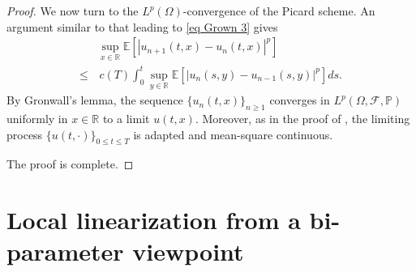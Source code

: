 \documentclass[11pt,reqno]{amsart}
\numberwithin{equation}{section}
\newcommand{\1}{{\bf 1}}
\newcommand{\2}{{\bf 2}}
\begin{document}
\begin{proof}
  We  now turn  to the  $L^p(\Omega)$-convergence of the Picard  scheme.   An argument similar to that leading to    \eqref{eq Grown 3} gives 
 \begin{equation}
 \begin{split}
& \sup_{x\in \mathbb R} \mathbb E \left[\left|u_{n+1}(t, x)-u_{n}(t, x)\right|^p\right]\\
 \le&\,  c(T) \int_0^t   \sup_{y\in \mathbb R} \mathbb E\left[\left|u_{n}(s, y)-u_{n-1}(s, y)\right|^p\right]  ds.
\end{split}
\end{equation}
By Gronwall’s lemma, the sequence  $\{u_n(t, x)\}_{n \ge 1}$ converges in $L^p(\Omega, \mathcal F, \mathbb P)$  uniformly in $x \in  \mathbb R$  to a limit $u(t, x)$.  Moreover, as in the proof of     \cite[Theorem 9]{DM03}, the limiting process   $\{u(t,\cdot)\}_{ 0 \le  t \le  T }$ is    adapted and   mean-square continuous.  
   
       The proof is complete. 
  \end{proof}
  
 

\section{Local linearization  from a bi-parameter viewpoint} \label{sec proof}
\end{document}
